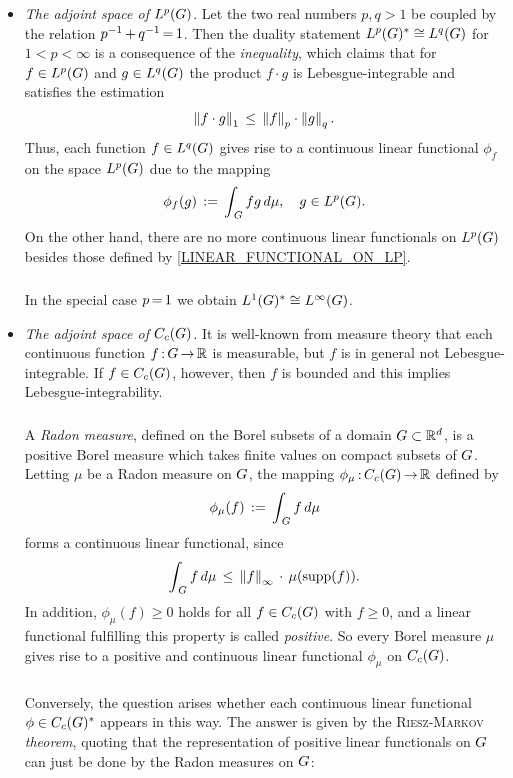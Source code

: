 \documentclass[11pt,twoside]{article}
\begin{document}
\begin{itemize}[leftmargin=15pt,itemsep=6pt]
\item[1.] \textit{The adjoint space of $L^p(G)$}.
Let the two real numbers $p,q >1$ be coupled
by the relation %
$p^{-1} \,{+}\, q^{-1} {\,=\,} 1$.
Then the duality statement $L^p(G)^* \cong L^q(G)$ for $1 < p < \infty$
is a consequence of the \textit{{\HOELDER} inequality},
which claims
that for $f \in L^p(G)$ and $g \in L^q(G)$
the product $f \cdot g$ is Lebesgue-integrable and satisfies the estimation
\[
\left\lVert f \cdot g \right\rVert_1 \, \leq \, \left\lVert f \right\rVert_p \cdot \left\lVert g \right\rVert_q.
\]
Thus,
each function $f \in L^q(G)$ gives rise to a continuous linear functional
$\phi_f$ on the space $L^p(G)$ due to the mapping
\begin{equation}\label{LINEAR_FUNCTIONAL_ON_LP}
\phi_f(g) \,:=\, \int_{\,G} fg \, d\mu, \quad g \in L^p(G).
\end{equation}
On the other hand,
there are no more continuous linear functionals on $L^p(G)$
besides those defined by \eqref{LINEAR_FUNCTIONAL_ON_LP}.

\subparagraph*{} %
In the special case $p {\,=\,} 1$ we obtain $L^1(G)^* \cong L^{\infty}(G)$.

\item[2.] \textit{The adjoint space of $C_c(G)$.}
It is well-known from measure theory
that each continuous function $f{\,:\,}G {\,\to\,} {\mathbb{R}}$ is measurable,
but $f$ is in general not Lebesgue-integrable.
If $f \in C_c(G)$,
however,
then $f$ is bounded and this implies Lebesgue-integrability.

\subparagraph*{} %
A \textit{Radon measure},
defined on the Borel subsets of a domain $G \subset {\mathbb{R}}^d$, 
is a positive Borel measure
which takes finite values on compact subsets of $G$.
Letting $\mu$ be a Radon measure on $G$,
the mapping $\phi_{\mu}{\,:\,} C_c(G) {\,\to\,} {\mathbb{R}}$ defined by
\[
\phi_{\mu}(f) \,:=\, \int_{\,G} f \, d\mu
\]
forms a continuous linear functional,
since
\[
\int_{\,G} f \, d\mu \, \leq \,
\left\lVert f \right\rVert_{\infty} \, \cdot \, \mu(\operatorname{supp}(f)).
\]
In addition,
$\phi_{\mu}(f) \geq 0$ holds for all $f \in C_c(G)$ with $f \geq 0$,
and a linear functional fulfilling this property is called \textit{positive}.
So every Borel measure $\mu$ gives rise to
a positive and continuous linear functional $\phi_{\mu}$ on $C_c(G)$.

\subparagraph*{} %
Conversely,
the question arises
whether each continuous linear functional $\phi \in C_c(G)^*$
appears in this way.
The answer is given by the \textsc{Riesz-Markov} \textit{theorem},
quoting
that the representation of positive linear functionals on $G$
can just be done by the Radon measures on $G$:


\end{itemize}
\end{document}
